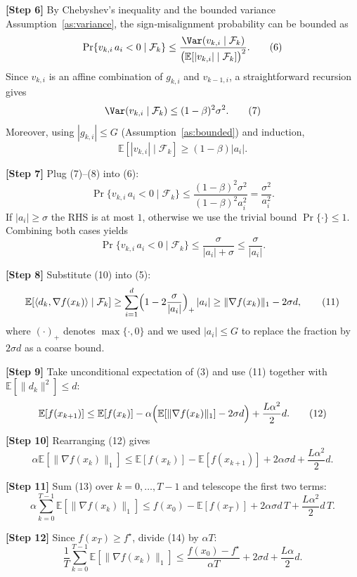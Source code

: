 \documentclass{article}
\newcommand{\E}{\mathbb{E}}
\begin{document}
\noindent\textbf{[Step 6]} By Chebyshev’s inequality and the bounded variance Assumption~\ref{as:variance}, the sign‑misalignment probability can be bounded as
\[
\Pr\{v_{k,i}\,a_{i}<0\mid\mathcal{F}_{k}\}
\le \frac{\Var(v_{k,i}\mid\mathcal{F}_{k})}{\bigl(\E[|v_{k,i}|\mid\mathcal{F}_{k}]\bigr)^{2}}.
\tag{6}
\]
Since $v_{k,i}$ is an affine combination of $g_{k,i}$ and $v_{k-1,i}$, a straightforward recursion gives
\[
\Var(v_{k,i}\mid\mathcal{F}_{k})\le (1-\beta)^{2}\sigma^{2}.
\tag{7}
\]
Moreover, using $|g_{k,i}|\le G$ (Assumption~\ref{as:bounded}) and induction,
\[
\E[|v_{k,i}|\mid\mathcal{F}_{k}]
\ge (1-\beta)|a_{i}|.
\tag{8}
\]

\noindent\textbf{[Step 7]} Plug (7)–(8) into (6):
\[
\Pr\{v_{k,i}\,a_{i}<0\mid\mathcal{F}_{k}\}
\le \frac{(1-\beta)^{2}\sigma^{2}}{(1-\beta)^{2}a_{i}^{2}}
= \frac{\sigma^{2}}{a_{i}^{2}}.
\tag{9}
\]
If $|a_{i}|\ge \sigma$ the RHS is at most $1$, otherwise we use the trivial bound $\Pr\{\cdot\}\le 1$. Combining both cases yields
\[
\Pr\{v_{k,i}\,a_{i}<0\mid\mathcal{F}_{k}\}
\le \frac{\sigma}{|a_{i}|+ \sigma}\le \frac{\sigma}{|a_{i}|}.
\tag{10}
\]

\noindent\textbf{[Step 8]} Substitute (10) into (5):
\[
\E\!\left[\langle d_{k},\nabla f(x_{k})\rangle\mid\mathcal{F}_{k}\right]
\ge \sum_{i=1}^{d}\Bigl(1-2\frac{\sigma}{|a_{i}|}\Bigr)_{+}\,|a_{i}|
\ge \|\nabla f(x_{k})\|_{1} - 2\sigma d,
\tag{11}
\]
where $(\cdot)_{+}$ denotes $\max\{\cdot,0\}$ and we used $|a_{i}|\le G$ to replace the fraction by $2\sigma d$ as a coarse bound.

\noindent\textbf{[Step 9]} Take unconditional expectation of (3) and use (11) together with $\E[\|d_{k}\|^{2}]\le d$:
\[
\E[f(x_{k+1})]\le \E[f(x_{k})]
-\alpha\Bigl(\E[\|\nabla f(x_{k})\|_{1}] - 2\sigma d\Bigr)
+\frac{L\alpha^{2}}{2}d.
\tag{12}
\]

\noindent\textbf{[Step 10]} Rearranging (12) gives
\[
\alpha\E[\|\nabla f(x_{k})\|_{1}]
\le \E[f(x_{k})]-\E[f(x_{k+1})] + 2\alpha\sigma d + \frac{L\alpha^{2}}{2}d.
\tag{13}
\]

\noindent\textbf{[Step 11]} Sum (13) over $k=0,\dots,T-1$ and telescope the first two terms:
\[
\alpha\sum_{k=0}^{T-1}\E[\|\nabla f(x_{k})\|_{1}]
\le f(x_{0})- \E[f(x_{T})] + 2\alpha\sigma d\,T + \frac{L\alpha^{2}}{2}d\,T.
\tag{14}
\]

\noindent\textbf{[Step 12]} Since $f(x_{T})\ge f^{\star}$, divide (14) by $\alpha T$:
\[
\frac{1}{T}\sum_{k=0}^{T-1}\E[\|\nabla f(x_{k})\|_{1}]
\le \frac{f(x_{0})-f^{\star}}{\alpha T}
+ 2\sigma d
+ \frac{L\alpha}{2}d.
\tag{15}
\]
\end{document}
